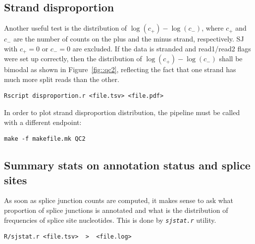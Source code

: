 \documentclass{article}
\newcommand{\prog}[1]{{\tt\em #1}}
\begin{document}
\subsection{Strand disproportion}
Another useful test is the distribution of $\log(c_+) - \log(c_-)$, where $c_+$ and $c_-$ are the number of counts on the plus and the minus strand, 
respectively. SJ with $c_+=0$ or $c_-=0$ are excluded. If the data is stranded and read1/read2 flags were set up correctly, then the distribution of
$\log(c_+) - \log(c_-)$ shall be bimodal as shown in Figure~\ref{fig::qc2}, reflecting the fact that one strand has much more split reads than 
the other.
\begin{verbatim}
Rscript disproportion.r <file.tsv> <file.pdf>
\end{verbatim}
In order to plot  strand disproportion distribution, the pipeline must be called with a different endpoint:
\begin{verbatim}
make -f makefile.mk QC2
\end{verbatim}

\subsection{Summary stats on annotation status and splice sites}
As soon as splice junction counts are computed, it makes sense to ask what proportion of splice junctions is annotated and what is the distribution of
frequencies of splice site nucleotides. This is done by \prog{sjstat.r} utility.
\begin{verbatim}
R/sjstat.r <file.tsv>  >  <file.log>
\end{verbatim}



\end{document}
